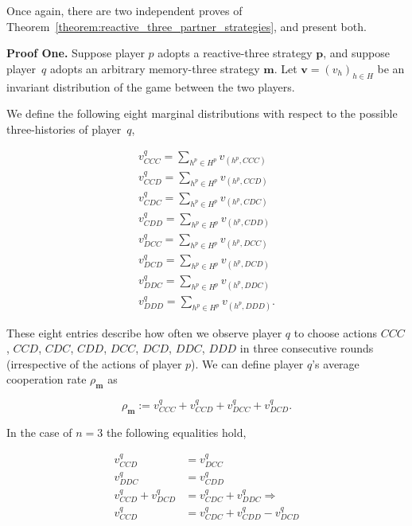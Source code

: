 \documentclass{article}
\theoremstyle{definition}
\begin{document}
Once again, there are two independent proves of
Theorem~\ref{theorem:reactive_three_partner_strategies}, and present both.

{\bf Proof One.} Suppose player $p$ adopts a reactive-three strategy
$\mathbf{p}$, and suppose player~$q$ adopts an arbitrary memory-three strategy
$\mathbf{m}$. Let $\mathbf{v}=(v_h)_{h\in H}$ be an invariant distribution of
the game between the two players.

We define the following eight marginal distributions with respect to the possible
three-histories of player~$q$,

\begin{equation}
\begin{array}{l}
\displaystyle v^q_{CCC} = \sum_{h^p\in H^p} v_{(h^p,CCC)}\\
\displaystyle v^q_{CCD} = \sum_{h^p\in H^p} v_{(h^p,CCD)}\\
\displaystyle v^q_{CDC} = \sum_{h^p\in H^p} v_{(h^p,CDC)}\\
\displaystyle v^q_{CDD} = \sum_{h^p\in H^p} v_{(h^p,CDD)}\\
\displaystyle v^q_{DCC} = \sum_{h^p\in H^p} v_{(h^p,DCC)}\\
\displaystyle v^q_{DCD} = \sum_{h^p\in H^p} v_{(h^p,DCD)}\\
\displaystyle v^q_{DDC} = \sum_{h^p\in H^p} v_{(h^p,DDC)}\\
\displaystyle v^q_{DDD} = \sum_{h^p\in H^p} v_{(h^p,DDD)}.
\end{array}
\end{equation}

These eight entries describe how often we observe player $q$ to choose actions
$CCC$, $CCD$, $CDC$, $CDD$, $DCC$, $DCD$, $DDC$, $DDD$ in three consecutive
rounds (irrespective of the actions of player $p$). We can define player $q$'s
average cooperation rate $\rho_\mathbf{m}$ as 

\begin{equation} \label{Eq:rhoq_n3}
\rho_\mathbf{m} := v^q_{CCC} + v^q_{CCD} + v^q_{DCC} + v^q_{DCD}.
\end{equation}

In the case of $n=3$ the following equalities hold,

\begin{align} 
  v^{q}_{CCD} & = v^{q}_{DCC} \label{Eq:Equality1_n3} \\ 
  v^{q}_{DDC} & = v^{q}_{CDD} \label{Eq:Equality2_n3} \\  
  v^{q}_{CCD} + v^{q}_{DCD}  & = v^{q}_{CDC} + v^{q}_{DDC} \Rightarrow \nonumber \\ 
  v^{q}_{CCD} & = v^{q}_{CDC} + v^{q}_{CDD} - v^{q}_{DCD} \label{Eq:Equality3_n3} 
\end{align}
\end{document}
